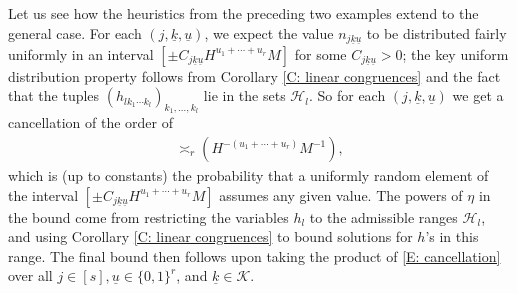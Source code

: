 \documentclass[11pt]{amsart}
\theoremstyle{definition}
\newcommand{\CH}{{\mathcal H}}
\newcommand{\CK}{{\mathcal K}}
\newcommand{\uk}{{\underline{k}}}
\newcommand{\uu}{{\underline{u}}}
\newcommand{\inv}{^{-1}}
\begin{document}
Let us see how the heuristics from the preceding two examples extend to the general case. 
For each $(j, \uk, \uu)$, we expect the value $n_{j\uk\uu}$ to be distributed fairly uniformly in an interval $[\pm C_{j\uk\uu} H^{u_1+\cdots + u_r} M]$
for some $C_{j\uk\uu}>0$; the key uniform distribution property follows from Corollary \ref{C: linear congruences} and the fact that the tuples $(h_{lk_1\cdots k_l})_{k_1, \ldots, k_l}$ lie in the sets $\CH_l$. 
So for each $(j, \uk, \uu)$ we get a cancellation of the order of
\begin{align}\label{E: cancellation}
\asymp_{r}(H^{-(u_1+\cdots + u_r)} M\inv),    
\end{align}
which is (up to constants) the probability that a uniformly random element of the interval $[\pm C_{j\uk\uu} H^{u_1+\cdots + u_r} M]$ assumes any given value. The powers of $\eta$ in the bound come from restricting the variables $h_l$ to the admissible ranges $\CH_l$, and using Corollary \ref{C: linear congruences} to bound solutions for $h$'s in this range. The final bound then follows upon taking the product of \eqref{E: cancellation} over all $j\in[s], \uu\in\{0,1\}^r$, and $\uk\in\CK$. 
\end{document}
